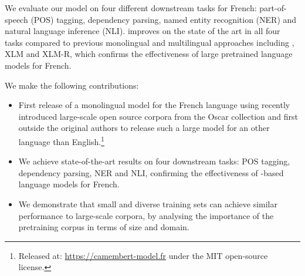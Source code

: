 We evaluate our model on four different downstream tasks for French: part-of-speech (POS) tagging, dependency parsing, named entity recognition (NER) and natural language inference (NLI).
\camembert improves on the state of the art in all four tasks compared to previous monolingual and multilingual approaches including \mbert, XLM and XLM-R, which confirms the effectiveness of large pretrained language models for French.

We make the following contributions:
\begin{itemize}
    \item First release of a monolingual \roberta model for the French language using recently introduced large-scale open source corpora from the Oscar collection and first outside the original \bert authors to release such a large model for an other language than English.\footnote{Released at:
              \mbox{\url{https://camembert-model.fr}} under the MIT open-source license.}

    \item We achieve state-of-the-art results on four downstream tasks: POS tagging, dependency parsing, NER and NLI, confirming the effectiveness of \bert-based language models for French.
    \item We demonstrate that small and diverse training sets can achieve similar performance to large-scale corpora, by analysing the importance of the pretraining corpus in terms of size and domain.%
\end{itemize}

